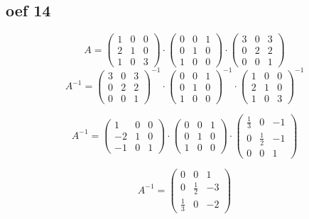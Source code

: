 \documentclass[10pt,a4paper]{article}
\begin{document}
\subsection*{oef 14}
$$
A = 
\begin{pmatrix}
1 & 0 & 0\\
2 & 1 & 0\\
1 & 0 & 3
\end{pmatrix}
\cdot
\begin{pmatrix}
0 & 0 & 1\\
0 & 1 & 0\\
1 & 0 & 0
\end{pmatrix}
\cdot
\begin{pmatrix}
3 & 0 & 3\\
0 & 2 & 2\\
0 & 0 & 1  
\end{pmatrix}
$$
$$
A^{-1} = 
\begin{pmatrix}
3 & 0 & 3\\
0 & 2 & 2\\
0 & 0 & 1  
\end{pmatrix}^{-1}
\cdot
\begin{pmatrix}
0 & 0 & 1\\
0 & 1 & 0\\
1 & 0 & 0
\end{pmatrix}^{-1}
\cdot
\begin{pmatrix}
1 & 0 & 0\\
2 & 1 & 0\\
1 & 0 & 3
\end{pmatrix}^{-1}
$$

$$
A^{-1}=
\begin{pmatrix}
1 & 0 & 0\\
-2 & 1 & 0\\
-1 & 0 & 1
\end{pmatrix}
\cdot
\begin{pmatrix}
0 & 0 & 1\\
0 & 1 & 0\\
1 & 0 & 0
\end{pmatrix}
\cdot
\begin{pmatrix}
\frac{1}{3} & 0 & -1\\
0 & \frac{1}{2} & -1\\
0 & 0 & 1
\end{pmatrix}
$$

$$
A^{-1}=
\begin{pmatrix}
0 & 0 & 1\\
0 & \frac{1}{2} & -3\\
\frac{1}{3} & 0 & -2
\end{pmatrix}
$$
\end{document}
